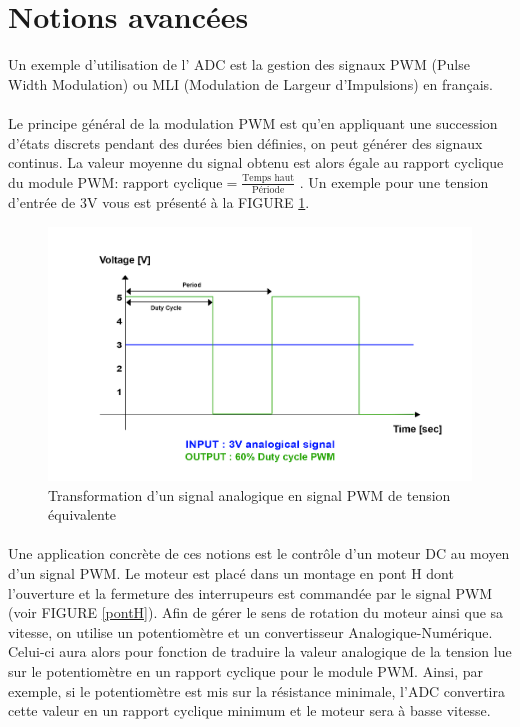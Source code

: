 \section{Notions avancées}
\label{notion}
Un exemple d'utilisation de l' ADC est la gestion des signaux PWM (Pulse Width Modulation) ou  MLI (Modulation de Largeur d'Impulsions) en français. 
\paragraph{}
Le principe général de la modulation PWM est qu'en appliquant une succession d'états discrets pendant des durées bien définies, on peut générer des signaux continus. La valeur moyenne du signal obtenu est alors égale au rapport cyclique du module PWM:   $\text {rapport cyclique} =  \frac{\text{Temps haut}}{\text{Période}}$ . Un exemple pour une tension d'entrée de 3V vous est présenté à la FIGURE \ref{pwm}.



\begin{figure}[h]
\begin{center}
\begin{framed}
\includegraphics[scale=0.8]{images/pwm.png}
\caption{Transformation d'un signal analogique en signal PWM de tension équivalente}
\label{pwm}
\end{framed}
\end{center}
\end{figure}

\paragraph{}
Une application concrète de ces notions est le contrôle d'un moteur DC au moyen d'un signal PWM. Le moteur est placé dans un montage en pont H dont l'ouverture et la fermeture des interrupeurs est commandée par le signal PWM (voir FIGURE \ref{pontH}). Afin de gérer le sens de rotation du moteur ainsi que sa vitesse, on utilise un potentiomètre et un convertisseur Analogique-Numérique. Celui-ci aura alors pour fonction de traduire la valeur analogique de la tension lue sur le potentiomètre en un rapport cyclique pour le module PWM. Ainsi, par exemple,  si le potentiomètre est mis sur la résistance minimale, l'ADC convertira cette valeur en un rapport cyclique minimum et le moteur sera à basse vitesse.

